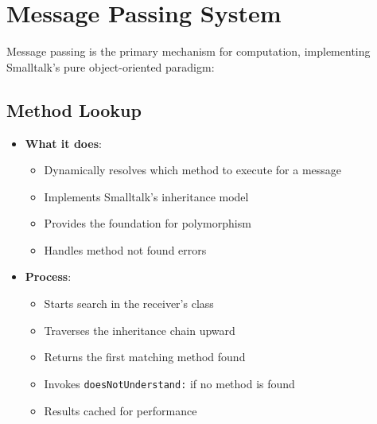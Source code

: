 \documentclass[12pt,a4paper]{report}
\begin{document}
\section{Message Passing System}
Message passing is the primary mechanism for computation, implementing Smalltalk's pure object-oriented paradigm:

\subsection{Method Lookup}
\begin{itemize}
    \item \textbf{What it does}:
    \begin{itemize}
        \item Dynamically resolves which method to execute for a message
        \item Implements Smalltalk's inheritance model
        \item Provides the foundation for polymorphism
        \item Handles method not found errors
    \end{itemize}
    
    \item \textbf{Process}:
    \begin{itemize}
        \item Starts search in the receiver's class
        \item Traverses the inheritance chain upward
        \item Returns the first matching method found
        \item Invokes \texttt{doesNotUnderstand:} if no method is found
        \item Results cached for performance
    \end{itemize}
\end{itemize}
\end{document}
